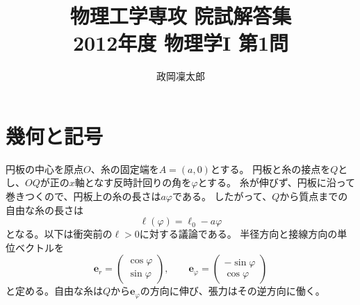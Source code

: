 \documentclass[11pt,a4paper]{article}
\title{物理工学専攻 院試解答集\\2012年度 物理学I 第1問}
\author{政岡凜太郎}
\date{}
\begin{document}
\maketitle

\section*{幾何と記号}
円板の中心を原点$O$、糸の固定端を$A=(a,0)$とする。
円板と糸の接点を$Q$とし、$OQ$が正の$x$軸となす反時計回りの角を$\varphi$とする。
糸が伸びず、円板に沿って巻きつくので、円板上の糸の長さは$a\varphi$である。
したがって、$Q$から質点までの自由な糸の長さは
\begin{equation}
  \ell(\varphi)=\ell_0-a\varphi
  \label{eq:length}
\end{equation}
となる。以下は衝突前の$\ell>0$に対する議論である。
半径方向と接線方向の単位ベクトルを
\begin{equation}
  \boldsymbol{e}_r=\begin{pmatrix}\cos\varphi\\\sin\varphi\end{pmatrix},
  \qquad
  \boldsymbol{e}_{\varphi}=\begin{pmatrix}-\sin\varphi\\\cos\varphi\end{pmatrix}
\end{equation}
と定める。自由な糸は$Q$から$\boldsymbol{e}_{\varphi}$の方向に伸び、張力はその逆方向に働く。
\end{document}
